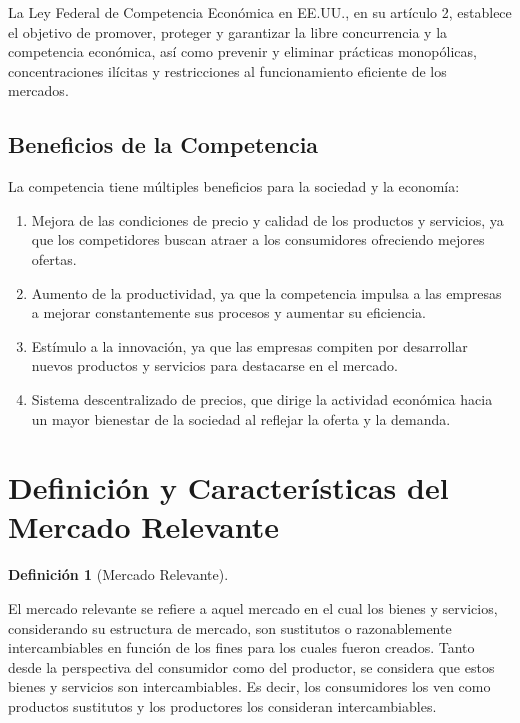 \documentclass[
  a4paper,
]{article}
\providecommand{\tightlist}{%
  \setlength{\itemsep}{0pt}\setlength{\parskip}{0pt}}\usepackage{longtable,booktabs,array}
\theoremstyle{definition}
\newtheorem{definition}{Definición}[section]
\theoremstyle{remark}
\begin{document}
La Ley Federal de Competencia Económica en EE.UU., en su artículo 2,
establece el objetivo de promover, proteger y garantizar la libre
concurrencia y la competencia económica, así como prevenir y eliminar
prácticas monopólicas, concentraciones ilícitas y restricciones al
funcionamiento eficiente de los mercados.

\hypertarget{beneficios-de-la-competencia}{%
\subsection{Beneficios de la
Competencia}\label{beneficios-de-la-competencia}}

La competencia tiene múltiples beneficios para la sociedad y la
economía:

\begin{enumerate}
\def\labelenumi{\arabic{enumi}.}
\tightlist
\item
  Mejora de las condiciones de precio y calidad de los productos y
  servicios, ya que los competidores buscan atraer a los consumidores
  ofreciendo mejores ofertas.
\item
  Aumento de la productividad, ya que la competencia impulsa a las
  empresas a mejorar constantemente sus procesos y aumentar su
  eficiencia.
\item
  Estímulo a la innovación, ya que las empresas compiten por desarrollar
  nuevos productos y servicios para destacarse en el mercado.
\item
  Sistema descentralizado de precios, que dirige la actividad económica
  hacia un mayor bienestar de la sociedad al reflejar la oferta y la
  demanda.
\end{enumerate}

\hypertarget{definiciuxf3n-y-caracteruxedsticas-del-mercado-relevante}{%
\section{Definición y Características del Mercado
Relevante}\label{definiciuxf3n-y-caracteruxedsticas-del-mercado-relevante}}

\begin{definition}[Mercado
Relevante]\protect\hypertarget{def-mercado-relevante}{}\label{def-mercado-relevante}

El mercado relevante se refiere a aquel mercado en el cual los bienes y
servicios, considerando su estructura de mercado, son sustitutos o
razonablemente intercambiables en función de los fines para los cuales
fueron creados. Tanto desde la perspectiva del consumidor como del
productor, se considera que estos bienes y servicios son
intercambiables. Es decir, los consumidores los ven como productos
sustitutos y los productores los consideran intercambiables.

\end{definition}
\end{document}
